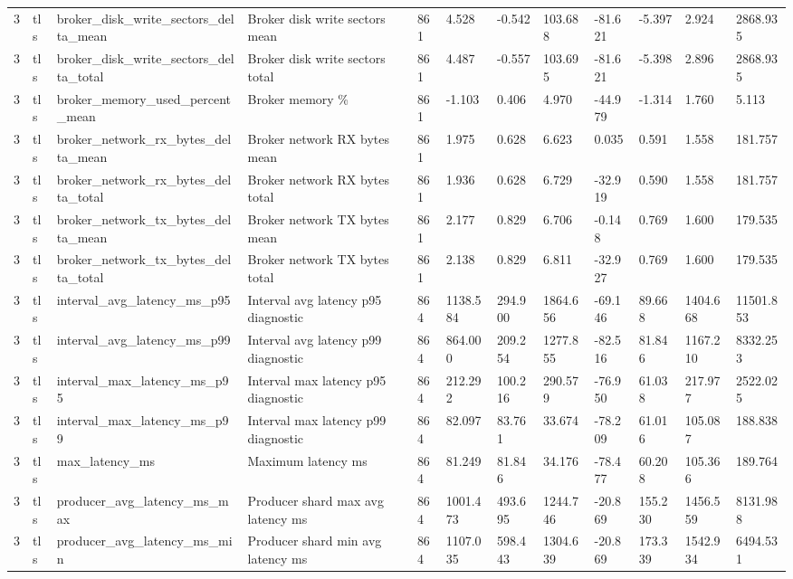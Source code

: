 \begin{longtable}{llllllllllll}
3 & tls & broker\_disk\_write\_sectors\_delta\_mean & Broker disk write sectors mean & 861 & 4.528 & -0.542 & 103.688 & -81.621 & -5.397 & 2.924 & 2868.935 \\
3 & tls & broker\_disk\_write\_sectors\_delta\_total & Broker disk write sectors total & 861 & 4.487 & -0.557 & 103.695 & -81.621 & -5.398 & 2.896 & 2868.935 \\
3 & tls & broker\_memory\_used\_percent\_mean & Broker memory \% & 861 & -1.103 & 0.406 & 4.970 & -44.979 & -1.314 & 1.760 & 5.113 \\
3 & tls & broker\_network\_rx\_bytes\_delta\_mean & Broker network RX bytes mean & 861 & 1.975 & 0.628 & 6.623 & 0.035 & 0.591 & 1.558 & 181.757 \\
3 & tls & broker\_network\_rx\_bytes\_delta\_total & Broker network RX bytes total & 861 & 1.936 & 0.628 & 6.729 & -32.919 & 0.590 & 1.558 & 181.757 \\
3 & tls & broker\_network\_tx\_bytes\_delta\_mean & Broker network TX bytes mean & 861 & 2.177 & 0.829 & 6.706 & -0.148 & 0.769 & 1.600 & 179.535 \\
3 & tls & broker\_network\_tx\_bytes\_delta\_total & Broker network TX bytes total & 861 & 2.138 & 0.829 & 6.811 & -32.927 & 0.769 & 1.600 & 179.535 \\
3 & tls & interval\_avg\_latency\_ms\_p95 & Interval avg latency p95 diagnostic & 864 & 1138.584 & 294.900 & 1864.656 & -69.146 & 89.668 & 1404.668 & 11501.853 \\
3 & tls & interval\_avg\_latency\_ms\_p99 & Interval avg latency p99 diagnostic & 864 & 864.000 & 209.254 & 1277.855 & -82.516 & 81.846 & 1167.210 & 8332.253 \\
3 & tls & interval\_max\_latency\_ms\_p95 & Interval max latency p95 diagnostic & 864 & 212.292 & 100.216 & 290.579 & -76.950 & 61.038 & 217.977 & 2522.025 \\
3 & tls & interval\_max\_latency\_ms\_p99 & Interval max latency p99 diagnostic & 864 & 82.097 & 83.761 & 33.674 & -78.209 & 61.016 & 105.087 & 188.838 \\
3 & tls & max\_latency\_ms & Maximum latency ms & 864 & 81.249 & 81.846 & 34.176 & -78.477 & 60.208 & 105.366 & 189.764 \\
3 & tls & producer\_avg\_latency\_ms\_max & Producer shard max avg latency ms & 864 & 1001.473 & 493.695 & 1244.746 & -20.869 & 155.230 & 1456.559 & 8131.988 \\
3 & tls & producer\_avg\_latency\_ms\_min & Producer shard min avg latency ms & 864 & 1107.035 & 598.443 & 1304.639 & -20.869 & 173.339 & 1542.934 & 6494.531 \\

\end{longtable}
